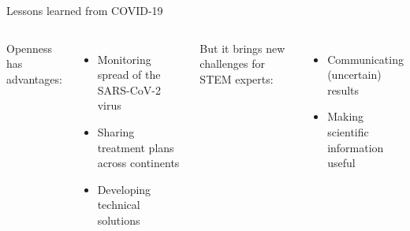 
\begin{frame}{Lessons learned from COVID-19}

\begin{columns}[t]

Openness has advantages:

\begin{itemize}
    \item Monitoring spread of the SARS-CoV-2 virus
    \item Sharing treatment plans across continents
    \item Developing technical solutions
\end{itemize}

\vspace{1cm}

But it brings new challenges for STEM experts:

\begin{itemize}
    \item Communicating (uncertain) results
    \item Making scientific information useful
\end{itemize}


\end{columns}
\end{frame}
